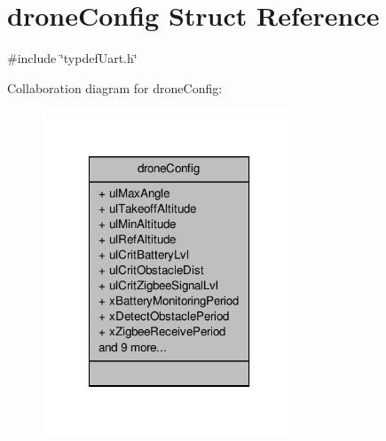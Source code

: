 \hypertarget{structdroneConfig}{\section{drone\-Config Struct Reference}
\label{structdroneConfig}
}


{\ttfamily \#include \char`\"{}typdef\-Uart.\-h\char`\"{}}



Collaboration diagram for drone\-Config\-:\nopagebreak
\begin{figure}[H]
\begin{center}
\leavevmode
\includegraphics[width=214pt]{structdroneConfig__coll__graph}
\end{center}
\end{figure}
